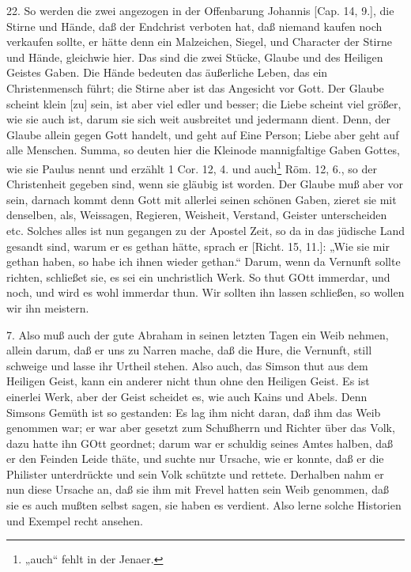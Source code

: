 22. So werden die zwei angezogen in der Offenbarung Johannis [Cap. 14, 9.], die Stirne und Hände, daß der Endchrist verboten hat, daß niemand kaufen noch verkaufen sollte, er hätte denn ein Malzeichen, Siegel, und Character der Stirne und Hände, gleichwie hier. Das sind die zwei Stücke, Glaube und des Heiligen Geistes Gaben. Die Hände bedeuten das äußerliche Leben, das ein Christenmensch führt; die Stirne aber ist das Angesicht vor Gott. Der Glaube scheint klein [zu] sein, ist aber viel edler und besser; die Liebe scheint viel größer, wie sie auch ist, darum sie sich weit ausbreitet und jedermann dient. Denn, der Glaube allein gegen Gott handelt, und geht auf Eine Person; Liebe aber geht auf alle Menschen. Summa, so deuten hier die Kleinode mannigfaltige Gaben Gottes, wie sie Paulus nennt und erzählt 1 Cor. 12, 4. und auch\footnote{„auch“ fehlt in der Jenaer.} Röm. 12, 6., so der Christenheit gegeben sind, wenn sie gläubig ist worden. Der Glaube muß aber vor sein, darnach kommt denn Gott mit allerlei seinen schönen Gaben, zieret sie mit denselben, als, Weissagen, Regieren, Weisheit, Verstand, Geister unterscheiden etc. Solches alles ist nun gegangen zu der Apostel Zeit, so da in das jüdische Land gesandt sind,
warum er es gethan hätte, sprach er [Richt. 15, 11.]: „Wie sie mir gethan haben, so habe ich ihnen wieder gethan.“ Darum, wenn da Vernunft sollte richten, schließet sie, es sei ein unchristlich Werk. So thut GOtt immerdar, und noch, und wird es wohl immerdar thun. Wir sollten ihn lassen schließen, so wollen wir ihn meistern.

7. Also muß auch der gute Abraham in seinen letzten Tagen ein Weib nehmen, allein darum, daß er uns zu Narren mache, daß die Hure, die Vernunft, still schweige und lasse ihr Urtheil stehen. Also auch, das Simson thut aus dem Heiligen Geist, kann ein anderer nicht thun ohne den Heiligen Geist. Es ist einerlei Werk, aber der Geist scheidet es, wie auch Kains und Abels. Denn Simsons Gemüth ist so gestanden: Es lag ihm nicht daran, daß ihm das Weib genommen war; er war aber gesetzt zum Schußherrn und Richter über das Volk, dazu hatte ihn GOtt geordnet; darum war er schuldig seines Amtes halben, daß er den Feinden Leide thäte, und suchte nur Ursache, wie er konnte, daß er die Philister unterdrückte und sein Volk schützte und rettete. Derhalben nahm er nun diese Ursache an, daß sie ihm mit Frevel hatten sein Weib genommen, daß sie es auch mußten selbst sagen, sie haben es verdient. Also lerne solche Historien und Exempel recht ansehen.

